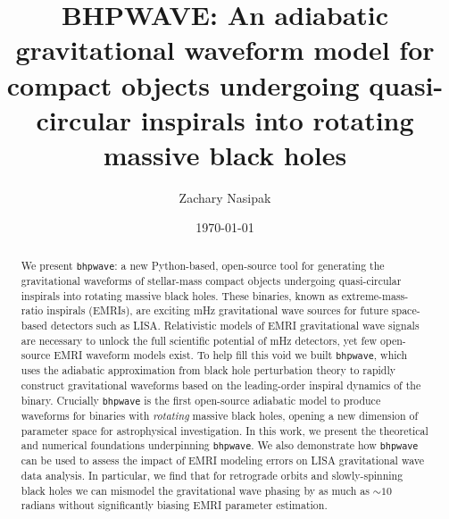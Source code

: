 \documentclass[%
 reprint,
 nofootinbib,
 amsmath,amssymb,
 aps,
 prd,
]{revtex4-2}
\begin{document}

\title{BHPWAVE: An adiabatic gravitational waveform model for compact objects undergoing quasi-circular inspirals into rotating massive black holes}%

\author{Zachary Nasipak}

\date{\today}%

\begin{abstract}
We present \texttt{bhpwave}: a new Python-based, open-source tool for generating the gravitational waveforms of stellar-mass compact objects undergoing quasi-circular inspirals into rotating massive black holes. These binaries, known as extreme-mass-ratio inspirals (EMRIs), are exciting mHz gravitational wave sources for future space-based detectors such as LISA. Relativistic models of EMRI gravitational wave signals are necessary to unlock the full scientific potential of mHz detectors, yet few open-source EMRI waveform models exist. To help fill this void we built \texttt{bhpwave}, which uses the adiabatic approximation from black hole perturbation theory to rapidly construct gravitational waveforms based on the leading-order inspiral dynamics of the binary. Crucially \texttt{bhpwave} is the first open-source adiabatic model to produce waveforms for binaries with \emph{rotating} massive black holes, opening a new dimension of parameter space for astrophysical investigation. In this work, we present the theoretical and numerical foundations underpinning \texttt{bhpwave}. We also demonstrate how \texttt{bhpwave} can be used to assess the impact of EMRI modeling errors on LISA gravitational wave data analysis. In particular, we find that for retrograde orbits and slowly-spinning black holes we can mismodel the gravitational wave phasing by as much as $\sim 10$ radians without significantly biasing EMRI parameter estimation.
\end{abstract}

\maketitle
\end{document}
